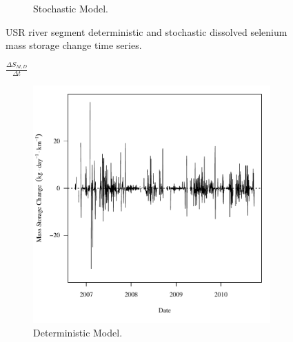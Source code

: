 \begin{linenumbers}
\begin{landscape}
\begin{figure}
\begin{subfigure}{0.7\textwidth}
			\caption{Stochastic Model.}
		\end{subfigure}
		\caption{USR river segment deterministic and stochastic dissolved selenium mass storage change time series.}
	\end{figure}
\end{landscape}

\subfiguremid
\begin{landscape}
	\begin{figure}
		$ \displaystyle \frac{\Delta S_{M,D}}{\Delta t} $
		\begin{subfigure}{0.7\textwidth}
			\centering
			\includegraphics[width=\tableCustomSize]{"Figures/Results_USR/Deterministic/f Segment D"}
			\caption{Deterministic Model.}
		\end{subfigure}%
		\begin{subfigure}{0.7\textwidth}
			\centering

\end{subfigure}
\end{figure}
\end{landscape}
\end{linenumbers}
